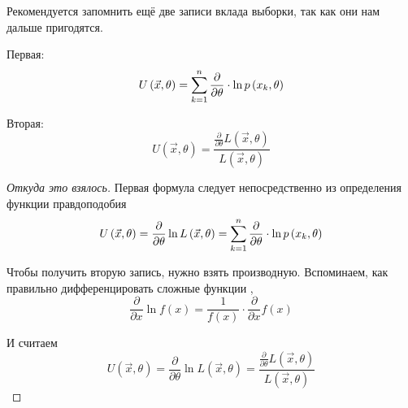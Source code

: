 \begin{remark}\label{remark:defU}
    Рекомендуется запомнить ещё две записи вклада выборки, так как они нам
    дальше пригодятся.

    Первая:
    $$U\left( \vec{x},\theta \right)
        =\sum_{k=1}^n\frac{\partial}{\partial\theta}\cdot\ln{p\left(x_k,\theta\right)}$$

    Вторая:
    $$U\left( \vec{x},\theta \right)
        =\frac{\frac{\partial}{\partial\theta}L\left(\vec{x},\theta\right)}
            {L\left(\vec{x},\theta\right)}$$
\end{remark}
\begin{proof}[Откуда это взялось]
    Первая формула следует непосредственно из определения функции правдоподобия
    $$U\left( \vec{x},\theta \right)
            =\frac{\partial}{\partial\theta}\ln{L\left(\vec{x},\theta\right)}
            =\sum_{k=1}^n
                \frac{\partial}{\partial\theta}\cdot\ln{p\left(x_k,\theta\right)}$$

    Чтобы получить вторую запись, нужно взять производную.
    Вспоминаем, как правильно дифференцировать сложные функции
    \cite[с.~226]{Fichtenholz1}, \cite[с.~133]{DorogovtsevMA}
    $$\frac{\partial}{\partial x} \ln{f\left( x \right)}
        = \frac{1}{f\left( x \right)}
            \cdot \frac{\partial}{\partial x} f\left( x \right)$$

    И считаем
    $$U\left( \vec{x},\theta \right)
        =\frac{\partial}{\partial\theta}\ln{L\left(\vec{x},\theta\right)}
        =\frac{\frac{\partial}{\partial\theta}L\left(\vec{x},\theta\right)}
            {L\left(\vec{x},\theta\right)}$$
\end{proof}

